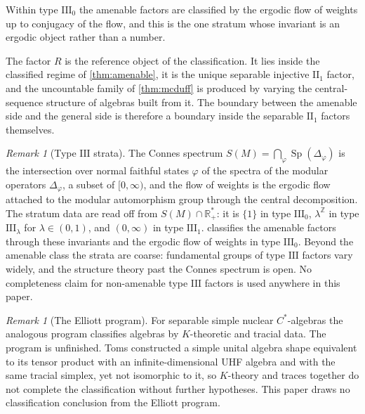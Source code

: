 \documentclass[11pt,letterpaper]{article}
\theoremstyle{definition}
\theoremstyle{remark}
\newtheorem{remark}[theorem]{Remark}
\begin{document}
Within type $\mathrm{III}_0$ the amenable factors are classified by the ergodic flow of weights up to conjugacy of the flow, and this is the one stratum whose invariant is an ergodic object rather than a number.

The factor $R$ is the reference object of the classification. It lies inside the classified regime of \cref{thm:amenable}, it is the unique separable injective $\mathrm{II}_1$ factor, and the uncountable family of \cref{thm:mcduff} is produced by varying the central-sequence structure of algebras built from it. The boundary between the amenable side and the general side is therefore a boundary inside the separable $\mathrm{II}_1$ factors themselves.

\begin{remark}[Type $\mathrm{III}$ strata]
\label{rem:typeIII}
The Connes spectrum $S(M) = \bigcap_{\varphi} \operatorname{Sp}(\Delta_\varphi)$ is the intersection over normal faithful states $\varphi$ of the spectra of the modular operators $\Delta_\varphi$, a subset of $[0, \infty)$, and the flow of weights is the ergodic flow attached to the modular automorphism group through the central decomposition. The stratum data are read off from $S(M) \cap \mathbb{R}_+^*$: it is $\{1\}$ in type $\mathrm{III}_0$, $\lambda^{\mathbb{Z}}$ in type $\mathrm{III}_\lambda$ for $\lambda \in (0,1)$, and $(0, \infty)$ in type $\mathrm{III}_1$.  classifies the amenable factors through these invariants and the ergodic flow of weights in type $\mathrm{III}_0$. Beyond the amenable class the strata are coarse: fundamental groups of type $\mathrm{III}$ factors vary widely, and the structure theory past the Connes spectrum is open. No completeness claim for non-amenable type $\mathrm{III}$ factors is used anywhere in this paper.
\end{remark}

\begin{remark}[The Elliott program]
\label{rem:elliott}
For separable simple nuclear $C^*$-algebras the analogous program classifies algebras by $K$-theoretic and tracial data. The program is unfinished. Toms constructed a simple unital algebra shape equivalent to its tensor product with an infinite-dimensional UHF algebra and with the same tracial simplex, yet not isomorphic to it, so $K$-theory and traces together do not complete the classification without further hypotheses. This paper draws no classification conclusion from the Elliott program.
\end{remark}
\end{document}
